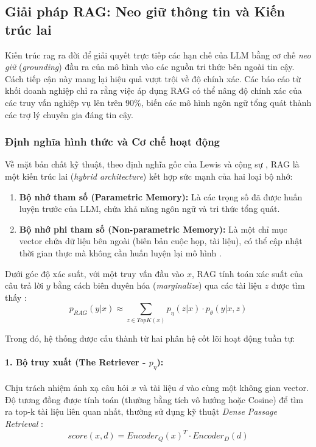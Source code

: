 \subsection{Giải pháp RAG: Neo giữ thông tin và Kiến trúc lai}
\label{subsec:rag_solution}

Kiến trúc \gls{rag} ra đời để giải quyết trực tiếp các hạn chế của LLM bằng cơ chế \textit{neo giữ} (\textit{grounding}) đầu ra của mô hình vào các nguồn tri thức bên ngoài tin cậy. Cách tiếp cận này mang lại hiệu quả vượt trội về độ chính xác. Các báo cáo từ khối doanh nghiệp chỉ ra rằng việc áp dụng RAG có thể nâng độ chính xác của các truy vấn nghiệp vụ lên trên 90\%, biến các mô hình ngôn ngữ tổng quát thành các trợ lý chuyên gia đáng tin cậy.

\subsubsection{Định nghĩa hình thức và Cơ chế hoạt động}
Về mặt bản chất kỹ thuật, theo định nghĩa gốc của Lewis và cộng sự \cite{lewis2020retrieval}, RAG là một kiến trúc lai (\textit{hybrid architecture}) kết hợp sức mạnh của hai loại bộ nhớ:
\begin{enumerate}
    \item \textbf{Bộ nhớ tham số (Parametric Memory):} Là các trọng số đã được huấn luyện trước của LLM, chứa khả năng ngôn ngữ và tri thức tổng quát.
    \item \textbf{Bộ nhớ phi tham số (Non-parametric Memory):} Là một chỉ mục vector chứa dữ liệu bên ngoài (biên bản cuộc họp, tài liệu), có thể cập nhật thời gian thực mà không cần huấn luyện lại mô hình \cite{lewis2020retrieval}.
\end{enumerate}

Dưới góc độ xác suất, với một truy vấn đầu vào $x$, RAG tính toán xác suất của câu trả lời $y$ bằng cách biên duyên hóa (\textit{marginalize}) qua các tài liệu $z$ được tìm thấy \cite{lewis2020retrieval}:
\begin{equation}
    p_{RAG}(y|x) \approx \sum_{z \in TopK(x)} p_\eta(z|x) \cdot p_\theta(y|x, z)
\end{equation}

Trong đó, hệ thống được cấu thành từ hai phân hệ cốt lõi hoạt động tuần tự:

\paragraph{1. Bộ truy xuất (The Retriever - $p_\eta$):} 
Chịu trách nhiệm ánh xạ câu hỏi $x$ và tài liệu $d$ vào cùng một không gian vector. Độ tương đồng được tính toán (thường bằng tích vô hướng hoặc Cosine) để tìm ra top-k tài liệu liên quan nhất, thường sử dụng kỹ thuật \textit{Dense Passage Retrieval} \cite{karpukhin2020dense}:
\begin{equation}
    score(x, d) = Encoder_Q(x)^T \cdot Encoder_D(d)
\end{equation}

